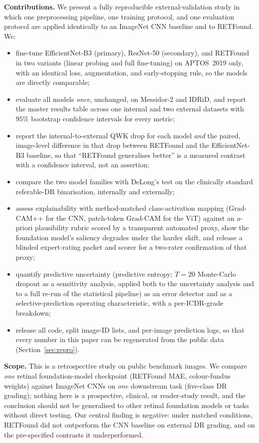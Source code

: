 \documentclass[journal]{IEEEtran}
\renewcommand{\_}{\origunderscore\allowbreak}
\begin{document}
\textbf{Contributions.} We present a fully reproducible external-validation study
in which one preprocessing pipeline, one training protocol, and one evaluation
protocol are applied identically to an ImageNet CNN baseline and to RETFound. We:
\begin{itemize}
  \item fine-tune EfficientNet-B3 (primary), ResNet-50 (secondary), and RETFound
    in two variants (linear probing and full fine-tuning) on APTOS~2019 only,
    with an identical loss, augmentation, and early-stopping rule, so the models
    are directly comparable;
  \item evaluate all models \emph{once}, unchanged, on Messidor-2 and IDRiD, and
    report the master results table across one internal and two external datasets
    with $95\%$ bootstrap confidence intervals for every metric;
  \item report the internal-to-external QWK drop for each model \emph{and} the
    paired, image-level difference in that drop between RETFound and the
    EfficientNet-B3 baseline, so that ``RETFound generalises better'' is a
    measured contrast with a confidence interval, not an assertion;
  \item compare the two model families with DeLong's test on the clinically
    standard referable-DR binarisation, internally and externally;
  \item assess explainability with method-matched class-activation mapping
    (Grad-CAM++ for the CNN, patch-token Grad-CAM for the ViT) against an
    a-priori plausibility rubric scored by a transparent automated proxy, show
    the foundation model's saliency degrades under the harder shift, and release
    a blinded expert-rating packet and scorer for a two-rater confirmation of
    that proxy;
  \item quantify predictive uncertainty (predictive entropy; $T=20$ Monte-Carlo
    dropout as a sensitivity analysis, applied both to the uncertainty analysis
    and to a full re-run of the statistical pipeline) as an error detector and as
    a selective-prediction operating characteristic, with a per-ICDR-grade
    breakdown;
  \item release all code, split image-ID lists, and per-image prediction logs, so
    that every number in this paper can be regenerated from the public data
    (Section~\ref{sec:repro}).
\end{itemize}

\textbf{Scope.} This is a retrospective study on public benchmark images. We
compare \emph{one} retinal foundation-model checkpoint (RETFound MAE,
colour-fundus weights) against ImageNet CNNs on \emph{one} downstream task
(five-class DR grading); nothing here is a prospective, clinical, or reader-study
result, and the conclusion should not be generalised to other retinal foundation
models or tasks without direct testing. Our central finding is negative: under
matched conditions, RETFound did not outperform the CNN baseline on external DR
grading, and on the pre-specified contrasts it underperformed.
\end{document}
